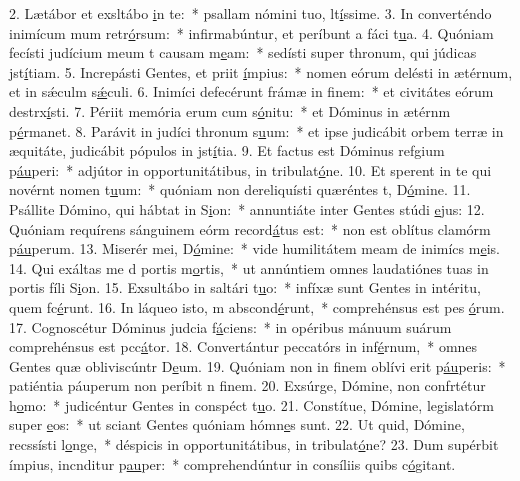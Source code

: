 2. Lætábor et exsltábo \uline{i}n te:~* psallam nómini tuo, lt\uline{í}ssime.
3. In converténdo inimícum mum retr\uline{ó}rsum:~* infirmabúntur, et períbunt a fáci t\uline{u}a.
4. Quóniam fecísti judícium meum t causam m\uline{e}am:~* sedísti super thronum, qui júdicas jst\uline{í}tiam.
5. Increpásti Gentes, et priit \uline{í}mpius:~* nomen eórum delésti in ætérnum, et in sǽculm s\uline{ǽ}culi.
6. Inimíci defecérunt frámæ in f\uline{i}nem:~* et civitátes eórum destrx\uline{í}sti.
7. Périit memória erum cum s\uline{ó}nitu:~* et Dóminus in ætérnm p\uline{é}rmanet.
8. Parávit in judíci thronum s\uline{u}um:~* et ipse judicábit orbem terræ in æquitáte, judicábit pópulos in jst\uline{í}tia.
9. Et factus est Dóminus refgium p\uline{áu}peri:~* adjútor in opportunitátibus, in tribulat\uline{ó}ne.
10. Et sperent in te qui novérnt nomen t\uline{u}um:~* quóniam non dereliquísti quæréntes t, D\uline{ó}mine.
11. Psállite Dómino, qui hábtat in S\uline{i}on:~* annuntiáte inter Gentes stúdi \uline{e}jus:
12. Quóniam requírens sánguinem eórm record\uline{á}tus est:~* non est oblítus clamórm p\uline{áu}perum.
13. Miserér mei, D\uline{ó}mine:~* vide humilitátem meam de inimícs m\uline{e}is.
14. Qui exáltas me d portis m\uline{o}rtis,~* ut annúntiem omnes laudatiónes tuas in portis fíli S\uline{i}on.
15. Exsultábo in saltári t\uline{u}o:~* infíxæ sunt Gentes in intéritu, quem fc\uline{é}runt.
16. In láqueo isto, m abscond\uline{é}runt,~* comprehénsus est pes \uline{ó}rum.
17. Cognoscétur Dóminus judcia f\uline{á}ciens:~* in opéribus mánuum suárum comprehénsus est pcc\uline{á}tor.
18. Convertántur peccatórs in inf\uline{é}rnum,~* omnes Gentes quæ obliviscúntr D\uline{e}um.
19. Quóniam non in finem oblívi erit p\uline{áu}peris:~* patiéntia páuperum non períbit n f\uline{i}nem.
20. Exsúrge, Dómine, non confrtétur h\uline{o}mo:~* judicéntur Gentes in conspéct t\uline{u}o.
21. Constítue, Dómine, legislatórm super \uline{e}os:~* ut sciant Gentes quóniam hómn\uline{e}s sunt.
22. Ut quid, Dómine, recssísti l\uline{o}nge,~* déspicis in opportunitátibus, in tribulat\uline{ó}ne?
23. Dum supérbit ímpius, incnditur p\uline{au}per:~* comprehendúntur in consíliis quibs c\uline{ó}gitant.
